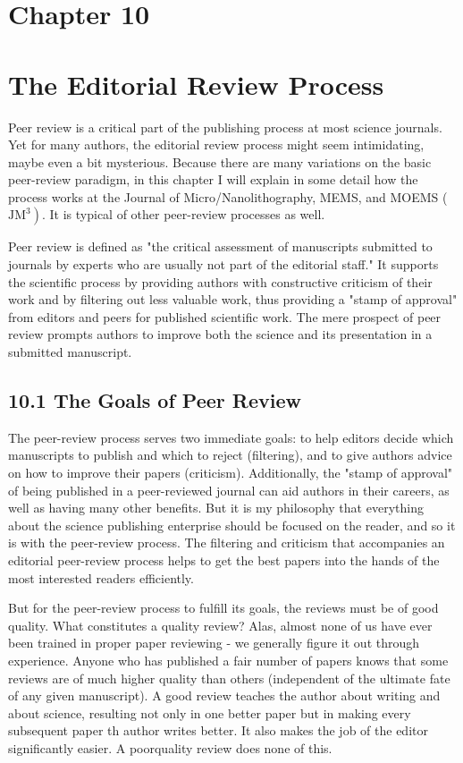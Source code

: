 \section*{Chapter 10}
\section*{The Editorial Review Process}
Peer review is a critical part of the publishing process at most science journals. Yet for many authors, the editorial review process might seem intimidating, maybe even a bit mysterious. Because there are many variations on the basic peer-review paradigm, in this chapter I will explain in some detail how the process works at the Journal of Micro/Nanolithography, MEMS, and MOEMS ( $\left.\mathrm{JM}^{3}\right)$. It is typical of other peer-review processes as well.

Peer review is defined as "the critical assessment of manuscripts submitted to journals by experts who are usually not part of the editorial staff." It supports the scientific process by providing authors with constructive criticism of their work and by filtering out less valuable work, thus providing a "stamp of approval" from editors and peers for published scientific work. The mere prospect of peer review prompts authors to improve both the science and its presentation in a submitted manuscript.

\subsection*{10.1 The Goals of Peer Review}
The peer-review process serves two immediate goals: to help editors decide which manuscripts to publish and which to reject (filtering), and to give authors advice on how to improve their papers (criticism). Additionally, the "stamp of approval" of being published in a peer-reviewed journal can aid authors in their careers, as well as having many other benefits. But it is my philosophy that everything about the science publishing enterprise should be focused on the reader, and so it is with the peer-review process. The filtering and criticism that accompanies an editorial peer-review process helps to get the best papers into the hands of the most interested readers efficiently.

But for the peer-review process to fulfill its goals, the reviews must be of good quality. What constitutes a quality review? Alas, almost none of us have ever been trained in proper paper reviewing - we generally figure it out through experience. Anyone who has published a fair number of papers knows that some reviews are of much higher quality than others (independent of the ultimate fate of any given manuscript). A good review teaches the author about writing and about science, resulting not only in one better paper but in making every subsequent paper th author writes better. It also makes the job of the editor significantly easier. A poorquality review does none of this.

